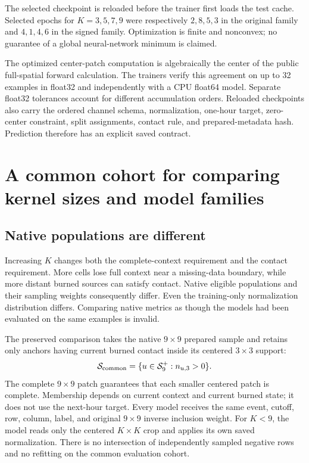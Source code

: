 \documentclass[11pt,a4paper]{article}
\begin{document}
The selected checkpoint is reloaded before the trainer first loads the test
cache. Selected epochs for $K=3,5,7,9$ were respectively $2,8,5,3$ in the
original family and $4,1,4,6$ in the signed family. Optimization is finite and
nonconvex; no guarantee of a global neural-network minimum is claimed.

The optimized center-patch computation is algebraically the center of the
public full-spatial forward calculation. The trainers verify this agreement
on up to 32 examples in float32 and independently with a CPU float64 model.
Separate float32 tolerances account for different accumulation orders.
Reloaded checkpoints also carry the ordered channel schema, normalization,
one-hour target, zero-center constraint, split assignments, contact rule, and
prepared-metadata hash. Prediction therefore has an explicit saved contract.

\section{A common cohort for comparing kernel sizes and model families}
\label{sec:probability-common}

\subsection{Native populations are different}

Increasing $K$ changes both the complete-context requirement and the contact
requirement. More cells lose full context near a missing-data boundary, while
more distant burned sources can satisfy contact. Native eligible populations
and their sampling weights consequently differ. Even the training-only
normalization distribution differs. Comparing native metrics as though the
models had been evaluated on the same examples is invalid.

The preserved comparison takes the native $9\times9$ prepared sample and
retains only anchors having current burned contact inside its centered
$3\times3$ support:
\begin{equation}
 \mathcal S_{\rm common}
 =\{u\in\mathcal S_9^+:n_{u,3}>0\}.
 \label{eq:prob-common-cohort}
\end{equation}
The complete $9\times9$ patch guarantees that each smaller centered patch
is complete. Membership depends on current context and current burned state;
it does not use the next-hour target. Every model receives the same event,
cutoff, row, column, label, and original $9\times9$ inverse inclusion weight.
For $K<9$, the model reads only the centered $K\times K$ crop and applies its
own saved normalization. There is no intersection of independently sampled
negative rows and no refitting on the common evaluation cohort.
\end{document}
